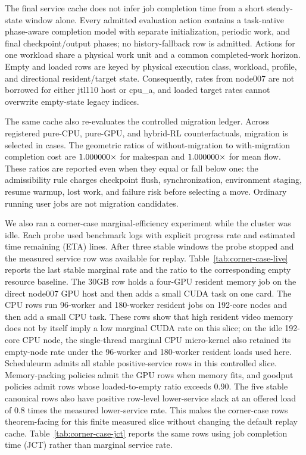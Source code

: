 \documentclass[opre,dblanonrev]{informs4}
\begin{document}
The final service cache does not infer job completion time from a short
steady-state window alone.  Every admitted evaluation action contains a
task-native phase-aware completion model with separate initialization, periodic
work, and final checkpoint/output phases; no history-fallback row is admitted.
Actions for one workload share a physical work unit and a common completed-work
horizon.  Empty and
loaded rows are keyed by physical execution class, workload, profile, and
directional resident/target state.  Consequently, rates from node007 are not
borrowed for either jtl110 host or cpu_a, and loaded target rates cannot
overwrite empty-state legacy indices.

The same cache also re-evaluates the controlled migration ledger.  Across
\UnifiedMigrationScenarioCount{} registered pure-CPU, pure-GPU, and hybrid-RL
counterfactuals, migration is selected in \UnifiedMigrationSelectedCount{}
cases.  The geometric ratios of without-migration to with-migration completion
cost are \(1.000000\times\) for makespan and
\(1.000000\times\) for mean flow.  These ratios are
reported even when they equal or fall below one: the admissibility rule charges
checkpoint flush, synchronization, environment staging, resume warmup, lost
work, and failure risk before selecting a move.  Ordinary running user jobs are
not migration candidates.

We also ran a corner-case marginal-efficiency experiment while the cluster was
idle.
Each probe used benchmark logs with explicit progress rate and estimated time
remaining (ETA) lines.  After three stable windows the probe stopped and the
measured service row was available for replay.  Table~\ref{tab:corner-case-live}
reports the last stable marginal rate and the ratio to the corresponding empty
resource baseline.  The 30GB row holds a four-GPU resident memory job on
the direct node007 GPU host and then adds a small CUDA task on one card.  The CPU
rows run 96-worker and 180-worker resident jobs on 192-core nodes and then add a
small CPU task.  These rows show that high resident video memory does not by
itself imply a low marginal CUDA rate on this slice; on the idle 192-core CPU
node, the single-thread marginal CPU micro-kernel also retained its empty-node
rate under the 96-worker and 180-worker resident loads used here.  Scheduleurm
admits all stable positive-service rows in this controlled slice.  Memory-packing
policies admit the GPU rows when memory fits, and goodput policies admit rows
whose loaded-to-empty ratio exceeds 0.90.  The five stable canonical rows also
have positive row-level lower-service slack at an offered load of \(0.8\) times
the measured lower-service rate.  This makes the corner-case rows theorem-facing
for this finite measured slice without changing the default replay cache.
Table~\ref{tab:corner-case-jct} reports the same rows using job completion time
(JCT) rather than marginal service rate.
\end{document}
